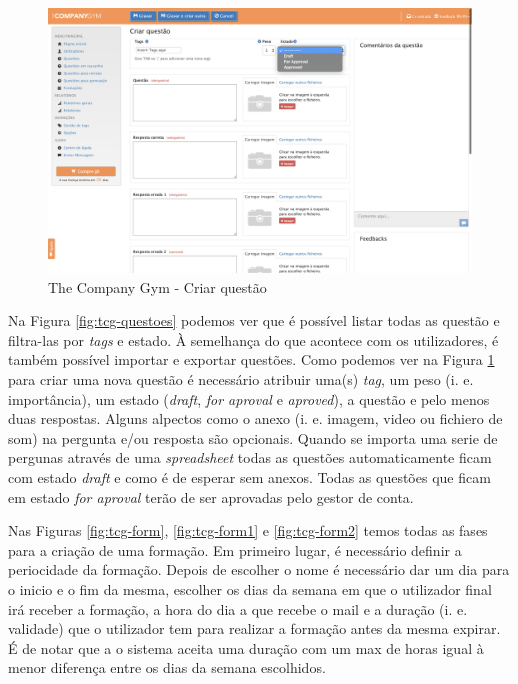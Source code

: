 \begin{figure}[ht!]
	\begin{center}
		\includegraphics[width=1\textwidth]{img/tcg/tcg-criar-questao.png}
		\caption{The Company Gym - Criar questão}
		\label{fig:tcg-criar-questoes}
	\end{center}
\end{figure}

Na Figura \ref{fig:tcg-questoes} podemos ver que é possível listar todas as questão e filtra-las por \textit{tags} e estado. À semelhança do que acontece com os utilizadores, é também possível importar e exportar questões. Como podemos ver na Figura \ref{fig:tcg-criar-questoes} para criar uma nova questão é necessário atribuir uma(s) \textit{tag}, um peso (i. e. importância), um estado (\textit{draft}, \textit{for aproval} e \textit{aproved}), a questão e pelo menos duas respostas. Alguns alpectos como o anexo (i. e. imagem, video ou fichiero de som) na pergunta e/ou resposta são opcionais. Quando se importa uma serie de pergunas através de uma \textit{spreadsheet} todas as questões automaticamente ficam com estado \textit{draft} e como é de esperar sem anexos. Todas as questões que ficam em estado \textit{for aproval} terão de ser aprovadas pelo gestor de conta.


Nas Figuras \ref{fig:tcg-form}, \ref{fig:tcg-form1} e \ref{fig:tcg-form2} temos todas as fases para a criação de uma formação. Em primeiro lugar, é necessário definir a periocidade da formação.  Depois de escolher o nome é necessário dar um dia para o inicio e o fim da mesma, escolher os dias da semana em que o utilizador final irá receber a formação, a hora do dia a que recebe o mail e a duração (i. e. validade) que o utilizador tem para realizar a formação antes da mesma expirar. É de notar que a o sistema aceita uma duração com um max de horas igual à menor diferença entre os dias da semana escolhidos.

